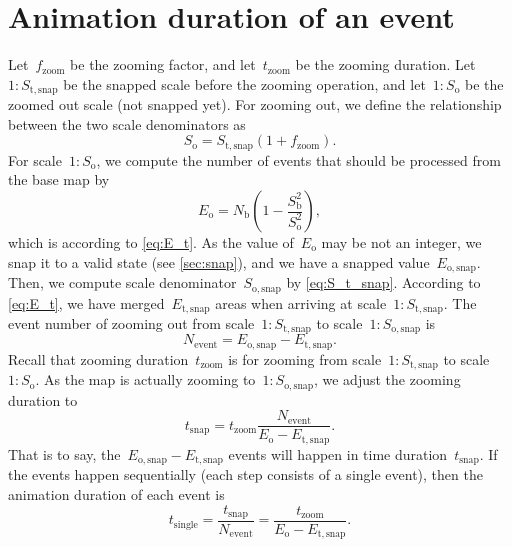 \documentclass[twocolumn]{svjour3}          %
\begin{document}
\section{Animation duration of an event}
\label{appx:animation_duration_event}

Let~$f_\mathrm{zoom}$ be the zooming factor, and 
let~$t_\mathrm{zoom}$ be the zooming duration.
Let~$1:S_\mathrm{t,snap}$ be the snapped scale before the zooming operation, and 
let~$1:S_\mathrm{o}$ be the zoomed out scale (not snapped yet).
For zooming out, we define the relationship 
between the two scale denominators as
\begin{equation}
\label{eq:S_o}
S_\mathrm{o} = S_\mathrm{t,snap} (1 + f_\mathrm{zoom}).
\end{equation}
For scale~$1:S_\mathrm{o}$, we compute the number of events
that should be processed from the base map by
\begin{equation*}
\label{eq:E_o}
E_\mathrm{o} = N_\mathrm{b} \left(1-\frac{S^2_\mathrm{b}}{S^2_\mathrm{o}}\right),
\end{equation*}
which is according to \eq\ref{eq:E_t}.
As the value of~$E_\mathrm{o}$ may be not an integer, 
we snap it to a valid state
(see \sect\ref{sec:snap}),
and we have a snapped value~$E_\mathrm{o,snap}$.
Then, we compute scale denominator~$S_\mathrm{o,snap}$
by \eq\ref{eq:S_t_snap}.
According to \eq\ref{eq:E_t}, we have merged~$E_\mathrm{t,snap}$ areas 
when arriving at scale~$1:S_\mathrm{t,snap}$.
The event number of zooming out
from scale~$1:S_\mathrm{t,snap}$ to scale~$1:S_\mathrm{o,snap}$ is
\begin{equation*}
\label{eq:N_event}
N_\mathrm{event} = 
E_\mathrm{o,snap} - E_\mathrm{t,snap}.
\end{equation*}
Recall that zooming duration~$t_\mathrm{zoom}$ is for zooming 
from scale~$1:S_\mathrm{t,snap}$ to scale~$1:S_\mathrm{o}$.
As the map is actually zooming to~$1:S_\mathrm{o,snap}$,
we adjust the zooming duration to
\begin{equation*}
\label{eq:E_i}
t_\mathrm{snap}= t_\mathrm{zoom} 
\frac{N_\mathrm{event}}
{E_\mathrm{o} - E_\mathrm{t,snap}}.
\end{equation*}
That is to say, the~$E_\mathrm{o,snap} - E_\mathrm{t,snap}$ events will happen 
in time duration~$t_\mathrm{snap}$.
If the events happen sequentially (each step consists of a single event), 
then the animation duration of each event is
\begin{equation}
\label{eq:t_single}
t_\mathrm{single}   = \frac{t_\mathrm{snap}}{N_\mathrm{event}} 
                    = \frac{t_\mathrm{zoom}}{E_\mathrm{o} - E_\mathrm{t,snap}}.
\end{equation}
\end{document}
